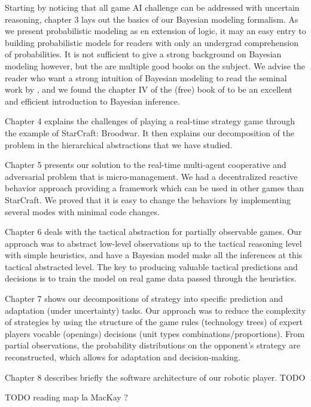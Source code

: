 Starting by noticing that all game AI challenge can be addressed with uncertain reasoning, chapter 3 lays out the basics of our Bayesian modeling formalism. As we present probabilistic modeling as en extension of logic, it may an easy entry to building probabilistic models for readers with only an undergrad comprehension of probabilities. It is not sufficient to give a strong background on Bayesian modeling however, but the are multiple good books on the subject. We advise the reader who want a strong intuition of Bayesian modeling to read the seminal work by \cite{Jaynes}, and we found the chapter IV of the (free) book of \cite{MacKay} to be an excellent and efficient introduction to Bayesian inference.

Chapter 4 explains the challenges of playing a real-time strategy game through the example of StarCraft: Broodwar. It then explains our decomposition of the problem in the hierarchical abstractions that we have studied.

Chapter 5 presents our solution to the real-time multi-agent cooperative and adversarial problem that is micro-management. We had a decentralized reactive behavior approach providing a framework which can be used in other games than StarCraft. We proved that it is easy to change the behaviors by implementing several modes with minimal code changes.

Chapter 6 deals with the tactical abstraction for partially observable games. Our approach was to abstract low-level observations up to the tactical reasoning level with simple heuristics, and have a Bayesian model make all the inferences at this tactical abstracted level. The key to producing valuable tactical predictions and decisions is to train the model on real game data passed through the heuristics.

Chapter 7 shows our decompositions of strategy into specific prediction and adaptation (under uncertainty) tasks. Our approach was to reduce the complexity of strategies by using the structure of the game rules (technology trees) of expert players vocable (openings) decisions (unit types combinations/proportions). From partial observations, the probability distributions on the opponent's strategy are reconstructed, which allows for adaptation and decision-making.

Chapter 8 describes briefly the software architecture of our robotic player. TODO


TODO reading map la MacKay ?


